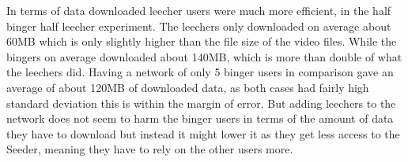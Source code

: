 In terms of data downloaded leecher users were much more efficient, in the half binger half leecher experiment. The leechers only downloaded on average about 60\acs{MB} which is only slightly higher than the file size of the video files. While the bingers on average downloaded about 140\acs{MB}, which is more than double of what the leechers did. %
Having a network of only 5 binger users in comparison gave an average of about 120\acs{MB} of downloaded data, as both cases had fairly high standard deviation this is within the margin of error. But adding leechers to the network does not seem to harm the binger users in terms of the amount of data they have to download but instead it might lower it as they get less access to the Seeder, meaning they have to rely on the other users more. %

